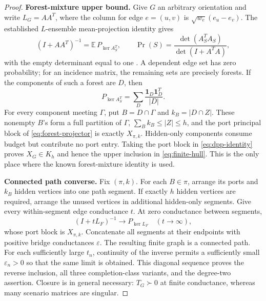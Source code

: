 \documentclass[journal,10pt]{IEEEtran}
\theoremstyle{definition}
\theoremstyle{remark}
\newcommand{\one}{\mathbf 1}
\begin{document}
\begin{proof}
\textbf{Forest-mixture upper bound.}
Give $G$ an arbitrary orientation and write $L_G=AA^T$, where the column for
edge $e=(u,v)$ is $\sqrt{w_e}(e_u-e_v)$.  The established $L$-ensemble
mean-projection identity gives
\begin{equation}
  (I+AA^T)^{-1}
  =\mathbb E\,P_{\ker A_S^T},
  \qquad
  \Pr(S)=\frac{\det(A_S^TA_S)}{\det(I+A^TA)},
  \label{eq:dpp-identity}
\end{equation}
with the empty determinant equal to one
\cite{derezinski2020,kassel2023}.  A dependent edge set has zero probability;
for an incidence matrix, the remaining sets are precisely forests.  If the
components of such a forest are $D$, then
\begin{equation}
  P_{\ker A_S^T}=\sum_D\frac{\one_D\one_D^T}{|D|}.
  \label{eq:forest-projector}
\end{equation}
For every component meeting $\Gamma$, put $B=D\cap\Gamma$ and
$k_B=|D\cap Z|$.  These nonempty $B$'s form a full partition of $\Gamma$,
$\sum_Bk_B\leq|Z|\leq h$, and the port principal block of
\eqref{eq:forest-projector} is exactly $X_{\pi,k}$.  Hidden-only components
consume budget but contribute no port entry.  Taking the port block in
\eqref{eq:dpp-identity} proves
$X_G\in K_h$ and hence the upper inclusion in \eqref{eq:finite-hull}.  This is
the only place where the known forest-mixture identity is used.

\textbf{Connected path converse.}
Fix $(\pi,k)$.  For each $B\in\pi$, arrange its ports and $k_B$ hidden
vertices into one path segment.  If exactly $h$ hidden vertices are required,
arrange the unused vertices in additional hidden-only segments.  Give every
within-segment edge conductance $t$.  At zero conductance between segments,
\begin{equation}
  (I+tL_F)^{-1}\longrightarrow P_{\ker L_F}
  \quad(t\to\infty),
  \label{eq:high-conductance}
\end{equation}
whose port block is $X_{\pi,k}$.  Concatenate all segments at their endpoints
with positive bridge conductances $\varepsilon$.  The resulting finite graph
is a connected path.  For each sufficiently large $t_n$, continuity of the
inverse permits a sufficiently small $\varepsilon_n>0$ so that the same limit
is obtained.  This diagonal sequence proves the reverse inclusion, all three
completion-class variants, and the degree-two assertion.  Closure is in
general necessary: $T_G\succ0$ at finite conductance, whereas many scenario
matrices are singular.


\end{proof}
\end{document}
